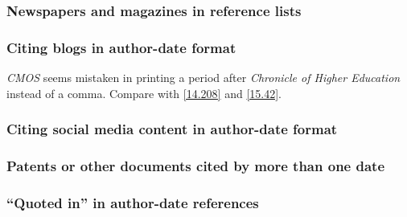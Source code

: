 \documentclass[11pt,letterpaper,oneside]{article}
\begin{document}
\subsubsection{Newspapers and magazines in reference lists}

\begin{citeref}
\item \parencite{nytimes2002}
\end{citeref}

\setcounter{subsubsection}{50}
\subsubsection{Citing blogs in author-date format}
\label{15.51}

\textit{CMOS} seems mistaken in printing a period after
\textit{Chronicle of Higher Education} instead of a comma. Compare
with \ref{14.208} and \ref{15.42}.

\begin{citeref}
\item \parencite{germano2017}
\end{citeref}

\subsubsection{Citing social media content in author-date format}
\label{15.52}

\begin{citeref}
\item \parencite{diaz2016}
\item \parencite{obrien2015}
\item \parencite{chicago2015}
\end{citeref}

\setcounter{subsubsection}{54}
\subsubsection{Patents or other documents cited by more than one date}

\begin{citeref}
\item \parencite{iizuka1986}
\end{citeref}

\subsubsection{``Quoted in'' in author-date references}
\end{document}
